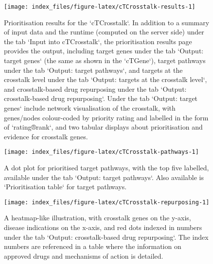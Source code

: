 \documentclass[
  oneside]{book}
\begin{document}
\begin{figure}

{\centering \texttt{[image: index\_files/figure-latex/cTCrosstalk-results-1]} 

}

\caption{Prioritisation results for the `cTCrosstalk`. In addition to a summary of input data and the runtime (computed on the server side) under the tab `Input into cTCrosstalk`, the prioritisation results page provides the output, including target genes under the tab `Output: target genes` (the same as shown in the `cTGene`), target pathways under the tab `Output: target pathways`, and targets at the crosstalk level under the tab `Output: targets at the crosstalk level`, and crosstalk-based drug repurposing under the tab `Output: crosstalk-based drug repurposing`. Under the tab `Output: target genes` include  network visualisation of the crosstalk, with genes/nodes colour-coded by priority rating and labelled in the form of `rating®rank`, and two tabular displays about prioritisation and evidence for crosstalk genes.}\label{fig:cTCrosstalk-results}
\end{figure}

\begin{figure}

{\centering \texttt{[image: index\_files/figure-latex/cTCrosstalk-pathways-1]} 

}

\caption{A dot plot for prioritised target pathways, with the top five labelled, available under the tab `Output: target pathways`. Also available is `Prioritisation table` for target pathways.}\label{fig:cTCrosstalk-pathways}
\end{figure}

\begin{figure}

{\centering \texttt{[image: index\_files/figure-latex/cTCrosstalk-repurposing-1]} 

}

\caption{A heatmap-like illustration, with crosstalk genes on the y-axis, disease indications on the x-axis, and red dots indexed in numbers under the tab `Output: crosstalk-based drug repurposing`. The index numbers are referenced in a table where the information on approved drugs and mechanisms of action is detailed.}\label{fig:cTCrosstalk-repurposing}
\end{figure}
\end{document}
